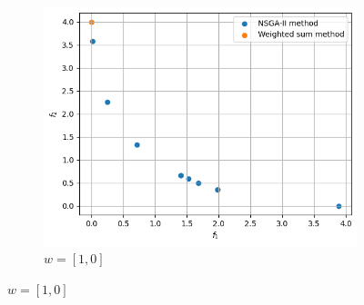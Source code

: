 \begin{figure}[ht]
\begin{subfigure}{0.32\textwidth}
        \includegraphics[width=\textwidth]{images/p3-w10_00.png}
        \caption{\(w = [1, 0]\)}
    \end{subfigure}


\end{figure}
